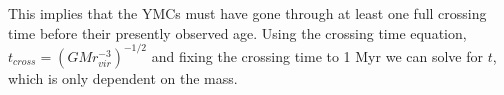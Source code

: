 This implies that the YMCs must have gone through at least one full crossing time before their presently observed age. Using the crossing time equation, $t_{cross}=(GMr_{vir}^{-3})^{-1/2}$ and fixing the crossing time to 1 Myr we can solve for $t$, which is only dependent on the mass.\cite{Arce_1999}